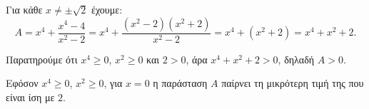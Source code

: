 
\begin{alist}
\item Για κάθε $x \ne \pm \sqrt{2}$ έχουμε:
\[A = x^4 + \dfrac{x^4 - 4}{x^2 - 2} = x^4 + \dfrac{(x^2 - 2)(x^2 + 2)}{x^2 - 2} = x^4 + (x^2 + 2) = x^4 + x^2 + 2.\]

\item
\begin{rlist}
\item Παρατηρούμε ότι $x^4 \ge 0$, $x^2 \ge 0$ και $2 > 0$, άρα $x^4 + x^2 + 2 > 0$, δηλαδή $A > 0$.
\item Εφόσον $x^4 \ge 0$, $x^2 \ge 0$, για $x = 0$ η παράσταση $A$ παίρνει τη μικρότερη τιμή της που είναι ίση με $2$.
\end{rlist}
\end{alist}

